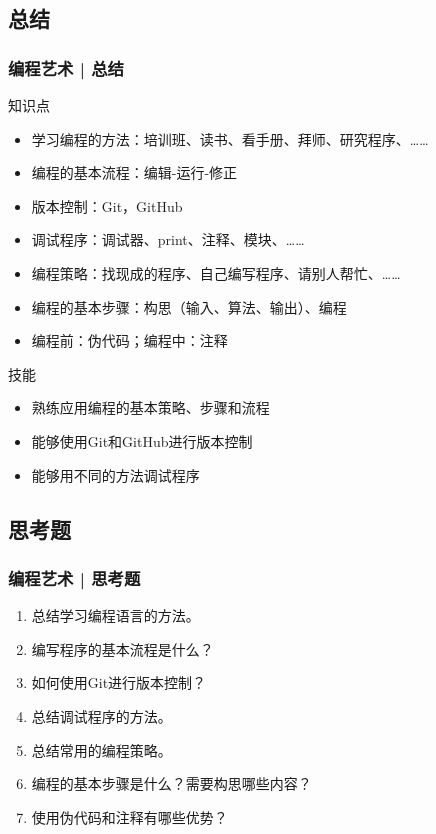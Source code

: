 \subsection{总结}
\begin{frame}
  \frametitle{编程艺术 | 总结}
  \begin{block}{知识点}
    \begin{itemize}
      \item 学习编程的方法：培训班、读书、看手册、拜师、研究程序、……
      \item 编程的基本流程：编辑-运行-修正
      \item 版本控制：Git，GitHub
      \item 调试程序：调试器、print、注释、模块、……
      \item 编程策略：找现成的程序、自己编写程序、请别人帮忙、……
      \item 编程的基本步骤：构思（输入、算法、输出）、编程
      \item 编程前：伪代码；编程中：注释
    \end{itemize}
  \end{block}
  \pause
  \begin{block}{技能}
    \begin{itemize}
      \item 熟练应用编程的基本策略、步骤和流程
      \item 能够使用Git和GitHub进行版本控制
      \item 能够用不同的方法调试程序
    \end{itemize}
  \end{block}
\end{frame}

\subsection{思考题}
\begin{frame}
  \frametitle{编程艺术 | 思考题}
  \begin{enumerate}
    \item 总结学习编程语言的方法。
    \item 编写程序的基本流程是什么？
    \item 如何使用Git进行版本控制？
    \item 总结调试程序的方法。
    \item 总结常用的编程策略。
    \item 编程的基本步骤是什么？需要构思哪些内容？
    \item 使用伪代码和注释有哪些优势？
  \end{enumerate}
\end{frame}

